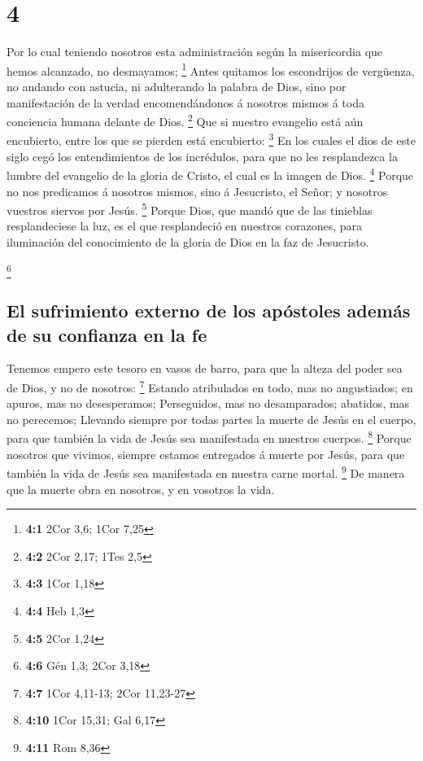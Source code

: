 \hypertarget{section-3}{%
\section{4}\label{section-3}}

 Por lo cual teniendo nosotros esta administración según la
misericordia que hemos alcanzado, no desmayamos; \footnote{\textbf{4:1}
  2Cor 3,6; 1Cor 7,25}  Antes quitamos los escondrijos de
vergüenza, no andando con astucia, ni adulterando la palabra de Dios,
sino por manifestación de la verdad encomendándonos á nosotros mismos á
toda conciencia humana delante de Dios. \footnote{\textbf{4:2} 2Cor
  2,17; 1Tes 2,5}  Que si nuestro evangelio está aún
encubierto, entre los que se pierden está encubierto: \footnote{\textbf{4:3}
  1Cor 1,18}  En los cuales el dios de este siglo cegó los
entendimientos de los incrédulos, para que no les resplandezca la lumbre
del evangelio de la gloria de Cristo, el cual es la imagen de Dios.
\footnote{\textbf{4:4} Heb 1,3}  Porque no nos predicamos á
nosotros mismos, sino á Jesucristo, el Señor; y nosotros vuestros
siervos por Jesús. \footnote{\textbf{4:5} 2Cor 1,24}  Porque
Dios, que mandó que de las tinieblas resplandeciese la luz, es el que
resplandeció en nuestros corazones, para iluminación del conocimiento de
la gloria de Dios en la faz de Jesucristo.

\footnote{\textbf{4:6} Gén 1,3; 2Cor 3,18}

\hypertarget{el-sufrimiento-externo-de-los-apuxf3stoles-ademuxe1s-de-su-confianza-en-la-fe}{%
\subsection{El sufrimiento externo de los apóstoles además de su
confianza en la
fe}\label{el-sufrimiento-externo-de-los-apuxf3stoles-ademuxe1s-de-su-confianza-en-la-fe}}

 Tenemos empero este tesoro en vasos de barro, para que la
alteza del poder sea de Dios, y no de nosotros: \footnote{\textbf{4:7}
  1Cor 4,11-13; 2Cor 11,23-27}  Estando atribulados en todo,
mas no angustiados; en apuros, mas no desesperamos; 
Perseguidos, mas no desamparados; abatidos, mas no perecemos;
 Llevando siempre por todas partes la muerte de Jesús en el
cuerpo, para que también la vida de Jesús sea manifestada en nuestros
cuerpos. \footnote{\textbf{4:10} 1Cor 15,31; Gal 6,17} 
Porque nosotros que vivimos, siempre estamos entregados á muerte por
Jesús, para que también la vida de Jesús sea manifestada en nuestra
carne mortal. \footnote{\textbf{4:11} Rom 8,36}  De manera
que la muerte obra en nosotros, y en vosotros la vida.

